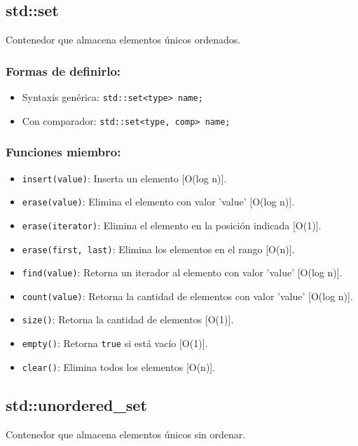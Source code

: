 \subsection{std::set}
\label{subsec:std_set}
Contenedor que almacena elementos únicos ordenados. 

\subsubsection{Formas de definirlo:}
\begin{itemize}
  \item Syntaxis genérica: \texttt{std::set<type> name;}
  \item Con comparador: \texttt{std::set<type, comp> name;}
\end{itemize}

\subsubsection{Funciones miembro:}
\begin{itemize}
  \item \texttt{insert(value)}: Inserta un elemento [O(log n)]. 
  \item \texttt{erase(value)}: Elimina el elemento con valor 'value' [O(log n)].
  \item \texttt{erase(iterator)}: Elimina el elemento en la posición indicada [O(1)].
  \item \texttt{erase(first, last)}: Elimina los elementos en el rango [O(n)].
  \item \texttt{find(value)}: Retorna un iterador al elemento con valor 'value' [O(log n)]. 
  \item \texttt{count(value)}: Retorna la cantidad de elementos con valor 'value' [O(log n)]. 
  \item \texttt{size()}: Retorna la cantidad de elementos [O(1)]. 
  \item \texttt{empty()}: Retorna \texttt{true} si está vacío [O(1)]. 
  \item \texttt{clear()}: Elimina todos los elementos [O(n)]. 
\end{itemize}

\subsection{std::unordered\_set}
\label{subsec:std_unordered_set}
Contenedor que almacena elementos únicos sin ordenar. 

